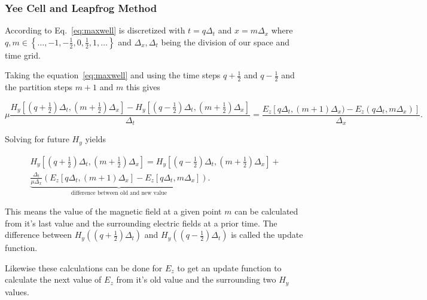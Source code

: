 \subsubsection{Yee Cell and Leapfrog Method}

According to \cite{yee} Eq.~\ref{eq:maxwell} is discretized with $t=q\Delta_t$ and $x=m\Delta_x$ where $q,m\in\left\{\dots,-1,-\frac{1}{2},0,\frac{1}{2},1,\dots\right\}$ and $\Delta_x, \Delta_t$ being the division of our space and time grid.

Taking the equation~\ref{eq:maxwell} and using the time steps $q+\frac{1}{2}$ and $q-\frac{1}{2}$ and the partition steps $m+1$ and $m$ this gives

\begin{equation}
  \mu\frac{H_y\left[\left(q+\frac{1}{2}\right)\Delta_t, (m+\frac{1}{2})\Delta_x\right]-H_y\left[\left(q-\frac{1}{2}\right)\Delta_t, (m+\frac{1}{2})\Delta_x\right]}{\Delta_t}=\frac{E_z\left[q\Delta_t, (m+1)\Delta_x)-E_z(q\Delta_t, m\Delta_x)\right]}{\Delta_x}.
\end{equation}

Solving for future $H_y$ yields

\begin{multline}
  H_y\left[\left(q+\frac{1}{2}\right)\Delta_t, \left(m+\frac{1}{2}\right)\Delta_x\right]=H_y\left[\left(q-\frac{1}{2}\right)\Delta_t, \left(m+\frac{1}{2}\right)\Delta_x\right] +\\
  \underbrace{\frac{\Delta_t}{\mu\Delta_x}\left(E_z\left[q\Delta_t, (m+1)\Delta_x\right]-E_z\left[q\Delta_t, m\Delta_x\right]\right)}_\text{difference between old and new value}.
\end{multline}

This means the value of the magnetic field at a given point $m$ can be calculated from it's last value and the surrounding electric fields at a prior time. The difference between $H_y((q+\frac{1}{2})\Delta_t)$ and $H_y((q-\frac{1}{2})\Delta_t)$ is called the update function.

Likewise these calculations can be done for $E_z$ to get an update function to calculate the next value of $E_z$ from it's old value and the surrounding two $H_y$ values.

